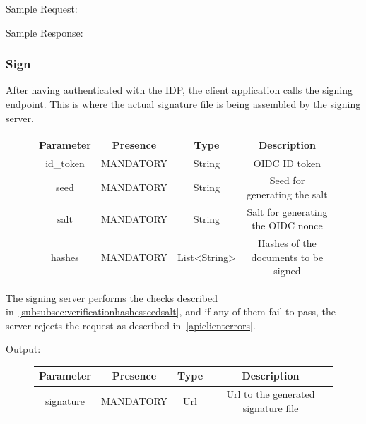 Sample Request:



Sample Response:



\subsubsection{Sign}\label{subsubsec:signrequest}
After having authenticated with the IDP, the client application calls the signing endpoint.
This is where the actual signature file is being assembled by the signing server.

\begin{figure}[H]
    \begin{center}
        \begin{tabular}{c|c|c|c}
            \textbf{Parameter} & \textbf{Presence} & \textbf{Type} & \textbf{Description} \\
            \hline
            id\_token & MANDATORY & String & OIDC ID token \\
            \hline
            seed & MANDATORY & String & Seed for generating the salt \\
            \hline
            salt & MANDATORY & String & Salt for generating the OIDC nonce \\
            \hline
            hashes & MANDATORY & List<String> & Hashes of the documents to be signed \\
        \end{tabular}
    \end{center}
\end{figure}

The signing server performs the checks described in~\ref{subsubsec:verificationhashesseedsalt},
and if any of them fail to pass,
the server rejects the request as described in~\ref{apiclienterrors}.

Output:

\begin{figure}[H]
    \begin{center}
        \begin{tabular}{c|c|c|c}
            \textbf{Parameter} & \textbf{Presence} & \textbf{Type} & \textbf{Description} \\
            \hline
            signature & MANDATORY & Url & Url to the generated signature file \\
        \end{tabular}
    \end{center}
\end{figure}

